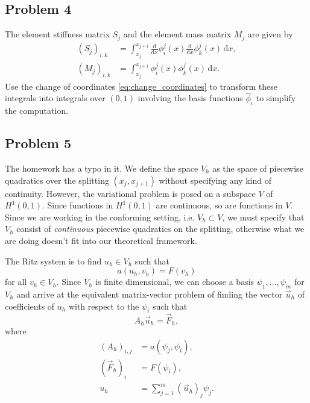 \documentclass{article}
\theoremstyle{definition}
\theoremstyle{plain}
\begin{document}
\subsection{Problem 4}
The element stiffness matrix $S_j$ and the element mass matrix $M_j$ are given by
\begin{align}
(S_j)_{i,k} & = \int_{x_j}^{x_{j+1}}\frac{\mathrm d}{\mathrm dx}\phi_i^j(x)\frac{\mathrm d}{\mathrm dx}\phi_k^j(x)\,\mathrm dx, \\
(M_j)_{i,k} & = \int_{x_j}^{x_{j+1}}\phi_i^j(x)\phi_k^j(x)\,\mathrm dx.
\end{align}
Use the change of coordinates \eqref{eq:change_coordinates} to transform these integrals into integrals over $(0,1)$ involving the basis functions $\widehat \phi_i$ to simplify the computation.

\subsection{Problem 5}
The homework has a typo in it.
We define the space $V_h$ as the space of piecewise quadratics over the splitting $(x_j, x_{j+1})$ without specifying any kind of continuity.
However, the variational problem is posed on a subspace $V$ of $H^1(0,1)$.
Since functions in $H^1(0,1)$ are continuous, so are functions in $V$.
Since we are working in the conforming setting, i.e. $V_h \subset V$, we must specify that $V_h$ consist of \emph{continuous} piecewise quadratics on the splitting, otherwise what we are doing doesn't fit into our theoretical framework.

The Ritz system is to find $u_h \in V_h$ such that \[a(u_h,v_h) = F(v_h)\] for all $v_h \in V_h$.
Since $V_h$ is finite dimensional, we can choose a basis $\psi_1,\dots,\psi_m$ for $V_h$ and arrive at the equivalent matrix-vector problem of finding the vector $\vec u_h$ of coefficients of $u_h$ with respect to the $\psi_i$ such that 
\begin{equation}\label{eq:ritz}
  A_h\vec u_h = \vec F_h,
\end{equation}
where 
\begin{align}
  (A_h)_{i,j} & = a(\psi_j,\psi_i), \\
  \label{eq:right} (\vec F_h)_i & = F(\psi_i), \\
  u_h & = \sum_{j=1}^m (\vec u_h)_j \psi_j.
\end{align}
\end{document}
